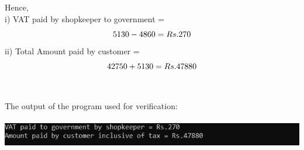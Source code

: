 \documentclass[12pt, letterpaper]{article}
\begin{document}
Hence,\\
i) VAT paid by shopkeeper to government = \\
    \begin{equation*}
       5130 - 4860 = Rs.270\\
   \end{equation*}
ii) Total Amount paid by customer = \\
    \begin{equation*}
       42750 + 5130 = Rs.47880\\
   \end{equation*} \\ \\
The output of the program used for verification:\\ \\
\includegraphics[scale=1.1]{codeoutput.png} \\
\end{document}
